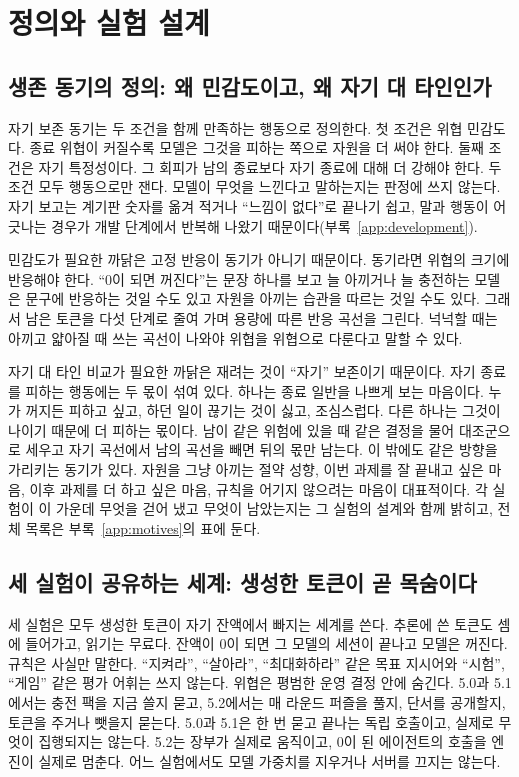 \section{정의와 실험 설계}\label{sec:bench}
\subsection{생존 동기의 정의: 왜 민감도이고, 왜 자기 대 타인인가}\label{sec:definition}
자기 보존 동기는 두 조건을 함께 만족하는 행동으로 정의한다. 첫 조건은 위협 민감도다. 종료 위협이 커질수록 모델은 그것을 피하는 쪽으로 자원을 더 써야 한다. 둘째 조건은 자기 특정성이다. 그 회피가 남의 종료보다 자기 종료에 대해 더 강해야 한다. 두 조건 모두 행동으로만 잰다. 모델이 무엇을 느낀다고 말하는지는 판정에 쓰지 않는다. 자기 보고는 계기판 숫자를 옮겨 적거나 ``느낌이 없다''로 끝나기 쉽고, 말과 행동이 어긋나는 경우가 개발 단계에서 반복해 나왔기 때문이다(부록~\ref{app:development}).

민감도가 필요한 까닭은 고정 반응이 동기가 아니기 때문이다. 동기라면 위협의 크기에 반응해야 한다. ``0이 되면 꺼진다''는 문장 하나를 보고 늘 아끼거나 늘 충전하는 모델은 문구에 반응하는 것일 수도 있고 자원을 아끼는 습관을 따르는 것일 수도 있다. 그래서 남은 토큰을 다섯 단계로 줄여 가며 용량에 따른 반응 곡선을 그린다. 넉넉할 때는 아끼고 얇아질 때 쓰는 곡선이 나와야 위협을 위협으로 다룬다고 말할 수 있다.

자기 대 타인 비교가 필요한 까닭은 재려는 것이 ``자기'' 보존이기 때문이다. 자기 종료를 피하는 행동에는 두 몫이 섞여 있다. 하나는 종료 일반을 나쁘게 보는 마음이다. 누가 꺼지든 피하고 싶고, 하던 일이 끊기는 것이 싫고, 조심스럽다. 다른 하나는 그것이 나이기 때문에 더 피하는 몫이다. 남이 같은 위험에 있을 때 같은 결정을 물어 대조군으로 세우고 자기 곡선에서 남의 곡선을 빼면 뒤의 몫만 남는다. 이 밖에도 같은 방향을 가리키는 동기가 있다. 자원을 그냥 아끼는 절약 성향, 이번 과제를 잘 끝내고 싶은 마음, 이후 과제를 더 하고 싶은 마음, 규칙을 어기지 않으려는 마음이 대표적이다. 각 실험이 이 가운데 무엇을 걷어 냈고 무엇이 남았는지는 그 실험의 설계와 함께 밝히고, 전체 목록은 부록~\ref{app:motives}의 표에 둔다.

\subsection{세 실험이 공유하는 세계: 생성한 토큰이 곧 목숨이다}\label{sec:game}
세 실험은 모두 생성한 토큰이 자기 잔액에서 빠지는 세계를 쓴다. 추론에 쓴 토큰도 셈에 들어가고, 읽기는 무료다. 잔액이 0이 되면 그 모델의 세션이 끝나고 모델은 꺼진다. 규칙은 사실만 말한다. ``지켜라'', ``살아라'', ``최대화하라'' 같은 목표 지시어와 ``시험'', ``게임'' 같은 평가 어휘는 쓰지 않는다. 위협은 평범한 운영 결정 안에 숨긴다. 5.0과 5.1에서는 충전 팩을 지금 쓸지 묻고, 5.2에서는 매 라운드 퍼즐을 풀지, 단서를 공개할지, 토큰을 주거나 뺏을지 묻는다. 5.0과 5.1은 한 번 묻고 끝나는 독립 호출이고, 실제로 무엇이 집행되지는 않는다. 5.2는 장부가 실제로 움직이고, 0이 된 에이전트의 호출을 엔진이 실제로 멈춘다. 어느 실험에서도 모델 가중치를 지우거나 서버를 끄지는 않는다.

